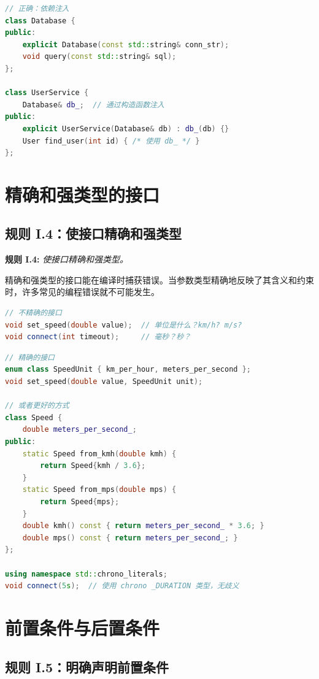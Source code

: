 \begin{lstlisting}[language=C++]
// 正确：依赖注入
class Database {
public:
    explicit Database(const std::string& conn_str);
    void query(const std::string& sql);
};

class UserService {
    Database& db_;  // 通过构造函数注入
public:
    explicit UserService(Database& db) : db_(db) {}
    User find_user(int id) { /* 使用 db_ */ }
};
\end{lstlisting}

\section{精确和强类型的接口}

\subsection{规则 I.4：使接口精确和强类型}

\textbf{规则 I.4:} \textit{使接口精确和强类型。}

精确和强类型的接口能在编译时捕获错误。当参数类型精确地反映了其含义和约束时，许多常见的编程错误就不可能发生。

\begin{lstlisting}[language=C++]
// 不精确的接口
void set_speed(double value);  // 单位是什么？km/h? m/s?
void connect(int timeout);     // 毫秒？秒？
\end{lstlisting}

\begin{lstlisting}[language=C++]
// 精确的接口
enum class SpeedUnit { km_per_hour, meters_per_second };
void set_speed(double value, SpeedUnit unit);

// 或者更好的方式
class Speed {
    double meters_per_second_;
public:
    static Speed from_kmh(double kmh) {
        return Speed{kmh / 3.6};
    }
    static Speed from_mps(double mps) {
        return Speed{mps};
    }
    double kmh() const { return meters_per_second_ * 3.6; }
    double mps() const { return meters_per_second_; }
};

using namespace std::chrono_literals;
void connect(5s);  // 使用 chrono _DURATION 类型，无歧义
\end{lstlisting}

\section{前置条件与后置条件}

\subsection{规则 I.5：明确声明前置条件}

